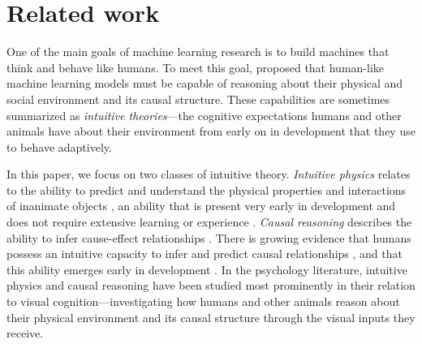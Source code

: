 \section{Related work}
One of the main goals of machine learning research is to build machines that think and behave like humans. To meet this goal, \citet{lake2017building} proposed that human-like machine learning models must be capable of reasoning about their physical and social environment and its causal structure. These capabilities are sometimes summarized as \textit{intuitive theories}---the cognitive expectations humans and other animals have about their environment from early on in development that they use to behave adaptively.

In this paper, we focus on two classes of intuitive theory. \textit{Intuitive physics} relates to the ability to predict and understand the physical properties and interactions of inanimate objects \citep{battaglia2012computational, piloto2022intuitive}, an ability that is present very early in development and does not require extensive learning or experience \cite{baillargeon1995acquisition,spelke1990principles,spelke2007core}. \textit{Causal reasoning} describes the ability to infer cause-effect relationships \citep{waldmann2017oxford, pearl2009causality}. There is growing evidence that humans possess an intuitive capacity to infer and predict causal relationships \citep{griffiths2009theory}, and that this ability emerges early in development \cite{kuhn2012development,sobel2006blickets}. In the psychology literature, intuitive physics and causal reasoning have been studied most prominently in their relation to visual cognition---investigating how humans and other animals reason about their physical environment and its causal structure through the visual inputs they receive.

